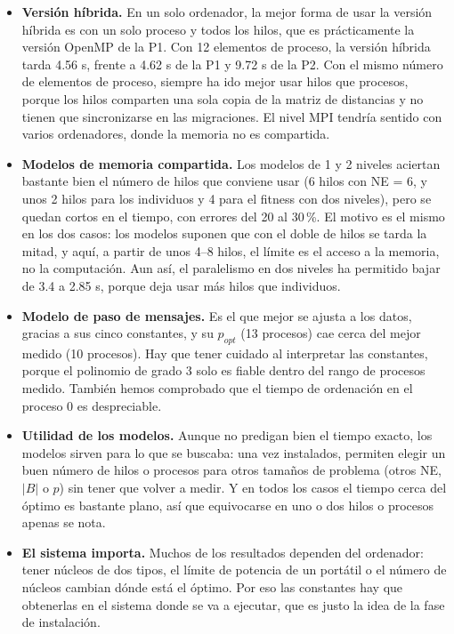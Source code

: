 \documentclass[12pt]{article}
\begin{document}
\begin{enumerate}
\begin{itemize}
    \item \textbf{Versión híbrida.} En un solo ordenador, la mejor forma de usar la versión híbrida es con un solo proceso y todos los hilos, que es prácticamente la versión OpenMP de la P1. Con 12 elementos de proceso, la versión híbrida tarda 4.56 s, frente a 4.62 s de la P1 y 9.72 s de la P2. Con el mismo número de elementos de proceso, siempre ha ido mejor usar hilos que procesos, porque los hilos comparten una sola copia de la matriz de distancias y no tienen que sincronizarse en las migraciones. El nivel MPI tendría sentido con varios ordenadores, donde la memoria no es compartida.
    \item \textbf{Modelos de memoria compartida.} Los modelos de 1 y 2 niveles aciertan bastante bien el número de hilos que conviene usar (6 hilos con NE = 6, y unos 2 hilos para los individuos y 4 para el fitness con dos niveles), pero se quedan cortos en el tiempo, con errores del 20 al 30\,\%. El motivo es el mismo en los dos casos: los modelos suponen que con el doble de hilos se tarda la mitad, y aquí, a partir de unos 4--8 hilos, el límite es el acceso a la memoria, no la computación. Aun así, el paralelismo en dos niveles ha permitido bajar de 3.4 a 2.85 s, porque deja usar más hilos que individuos.
    \item \textbf{Modelo de paso de mensajes.} Es el que mejor se ajusta a los datos, gracias a sus cinco constantes, y su $p_{opt}$ (13 procesos) cae cerca del mejor medido (10 procesos). Hay que tener cuidado al interpretar las constantes, porque el polinomio de grado 3 solo es fiable dentro del rango de procesos medido. También hemos comprobado que el tiempo de ordenación en el proceso 0 es despreciable.
    \item \textbf{Utilidad de los modelos.} Aunque no predigan bien el tiempo exacto, los modelos sirven para lo que se buscaba: una vez instalados, permiten elegir un buen número de hilos o procesos para otros tamaños de problema (otros NE, $|B|$ o $p$) sin tener que volver a medir. Y en todos los casos el tiempo cerca del óptimo es bastante plano, así que equivocarse en uno o dos hilos o procesos apenas se nota.
    \item \textbf{El sistema importa.} Muchos de los resultados dependen del ordenador: tener núcleos de dos tipos, el límite de potencia de un portátil o el número de núcleos cambian dónde está el óptimo. Por eso las constantes hay que obtenerlas en el sistema donde se va a ejecutar, que es justo la idea de la fase de instalación.
\end{itemize}


\end{enumerate}
\end{document}
